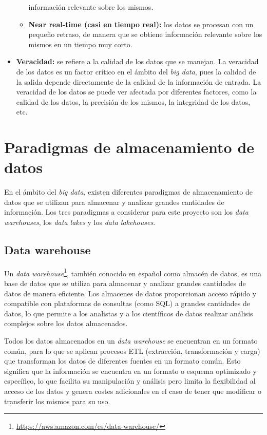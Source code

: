 \begin{itemize}
\begin{itemize}
				información relevante sobre los mismos.
			\item \textbf{Near real-time (casi en tiempo real):} los datos se
				procesan con un pequeño retraso, de manera que se obtiene
				información relevante sobre los mismos en un tiempo muy corto.
		\end{itemize}
	\item \textbf{Veracidad:} se refiere a la calidad de los datos que se
		manejan. La veracidad de los datos es un factor crítico en el ámbito del
		\textit{big data}, pues la calidad de la salida depende directamente de
		la calidad de la información de entrada. La veracidad de los datos se
		puede ver afectada por diferentes factores, como la calidad de los
		datos, la precisión de los mismos, la integridad de los datos, etc.
\end{itemize}


\newpage{}
\section{Paradigmas de almacenamiento de datos}\label{sec:paradigmas}
En el ámbito del \textit{big data}, existen diferentes paradigmas de
almacenamiento de datos que se utilizan para almacenar y analizar grandes
cantidades de información. Los tres paradigmas a considerar para este proyecto
son los \textit{data warehouses}, los \textit{data lakes} y los
\textit{data lakehouses}.


\subsection{Data warehouse}\label{sec:warehouse}
Un \textit{data warehouse}\footnote{
	\url{https://aws.amazon.com/es/data-warehouse/}
}, también conocido en español como almacén de datos, es una base de datos que
se utiliza para almacenar y analizar grandes cantidades de datos de manera
eficiente. Los almacenes de datos proporcionan acceso rápido y compatible con
plataformas de consultas (como SQL) a grandes cantidades de datos, lo que
permite a los analistas y a los científicos de datos realizar análisis complejos
sobre los datos almacenados.

Todos los datos almacenados en un \textit{data warehouse} se encuentran en un
formato común, para lo que se aplican procesos ETL (extracción, transformación y
carga) que transforman los datos de diferentes fuentes en un formato común. Esto
significa que la información se encuentra en un formato o esquema optimizado y
específico, lo que facilita su manipulación y análisis pero limita la
flexibilidad al acceso de los datos y genera costes adicionales en el caso de
tener que modificar o transferir los mismos para su uso.


